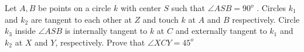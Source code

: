 Let $A,B$ be points on a circle $k$ with center $S$ such that $\angle ASB = 90^o$ . Circles $k_1$ and $k_2$ are tangent to each other at $Z$ and touch $k$ at $A$ and $B$ respectively. Circle $k_3$ inside $\angle ASB$ is internally tangent to $k$ at $C$ and externally tangent to $k_1$ and $k_2$ at $X$ and $Y$, respectively. Prove that $\angle XCY = 45^o$